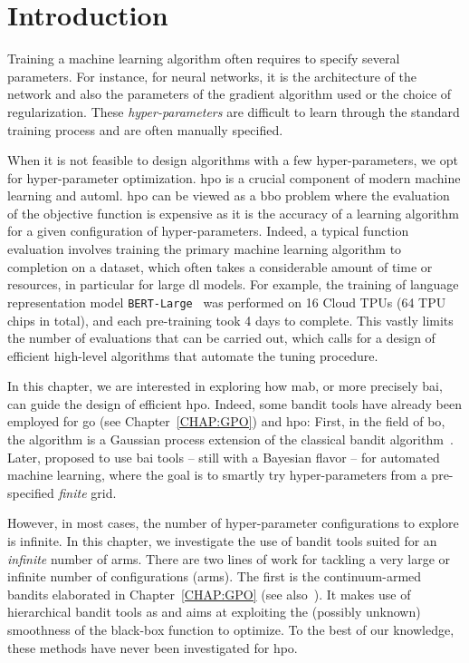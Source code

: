 \section{Introduction}\label{sec:dttts.intro}

Training a machine learning algorithm often requires to specify several parameters. For instance, for neural networks, it is the architecture of the network and also the parameters of the gradient algorithm used or the choice of regularization. These \emph{hyper-parameters} are difficult to learn through the standard training process and are often manually specified.

When it is not feasible to design algorithms with a few hyper-parameters, we opt for hyper-parameter optimization. \gls{hpo} is a crucial component of modern machine learning and \gls{automl}. \gls{hpo} can be viewed as a \gls{bbo} problem where the evaluation of the objective function is expensive as it is the accuracy of a learning algorithm for a given configuration of hyper-parameters. Indeed, a typical function evaluation involves training the primary machine learning algorithm to completion on a dataset, which often takes a considerable amount of time or resources, in particular for large \gls{dl} models. For example, the training of language representation model \texttt{BERT-Large}~\citep{devlin2019bert} was performed on 16 Cloud TPUs (64 TPU chips in total), and each pre-training took 4 days to complete. This vastly limits the number of evaluations that can be carried out, which calls for a design of efficient high-level algorithms that automate the tuning procedure.

In this chapter, we are interested in exploring how \gls{mab}, or more precisely \gls{bai}, can guide the design of efficient \gls{hpo}. Indeed, some bandit tools have already been employed for \gls{go} (see Chapter~\ref{CHAP:GPO}) and \gls{hpo}: First, in the field of \gls{bo}, the \GPUCB algorithm \citep{srinivas2010gpucb} is a Gaussian process extension of the classical \UCB bandit algorithm~\citep{auer2002ucb}. Later, \citet{hoffman2014bayesgap} proposed to use \gls{bai} tools -- still with a Bayesian flavor -- for automated machine learning, where the goal is to smartly try hyper-parameters from a pre-specified \emph{finite} grid. 

However, in most cases, the number of hyper-parameter configurations to explore is infinite. In this chapter, we investigate the use of bandit tools suited for an \emph{infinite} number of arms. There are two lines of work for tackling a very large or infinite number of configurations (arms). The first is the continuum-armed bandits elaborated in Chapter~\ref{CHAP:GPO} (see also~\citealt{bubeck2010x,grill2015poo,shang2019adaptive,bartlett2019simple}). It makes use of hierarchical bandit tools as  and aims at exploiting the (possibly unknown) smoothness of the black-box function to optimize. To the best of our knowledge, these methods have never been investigated for \gls{hpo}. 

